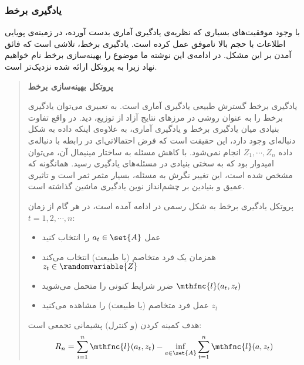 \subsubsection{
یادگیری برخط
}

با وجود موفقیت‌های بسیاری که نظریه‌ی یادگیری آماری بدست آورده، در زمینه‌ی پویایی اطلاعات با حجم بالا
ناموفق عمل کرده است. یادگیری برخط، تلاشی است که فائق آمدن بر این مشکل. در ادامه‌ی این نوشته ما موضوع را بهینه‌سازی برخط نام خواهیم نهاد زیرا به پروتکل ارائه شده نزدیک‌تر است.



\begin{quote}
{\bf
پروتکل بهینه‌سازی برخط
}

یادگیری برخط گسترش طبیعی یادگیری آماری است. به تعبیری می‌توان یادگیری برخط را به عنوان روشی در مرزهای نتایج آزاد از توزیع، دید. در واقع تفاوت بنیادی میان یادگیری برخط و یادگیری آماری، به علاوه‌ی اینکه داده به شکل دنباله‌ای وجود دارد، این حقیقت است که فرض احتمالاتی‌ای در رابطه با دنباله‌ی داده 
$Z_1, \cdots, Z_n$ 
انجام نمی‌شود. با کاهش مسئله به ساختار مینیمال
آن، می‌توان امیدوار بود که به سختی بنیادی در مسئله‌های یادگیری رسید. همانگونه که مشخص شده است، این تغییر نگرش به مسئله، بسیار مثمر ثمر است و تاثیری عمیق و بنیادین بر چشم‌انداز نوین یادگیری ماشین گذاشته است.


پروتکل یادگیری برخط به شکل رسمی در ادامه آمده است، در هر گام از زمان 
$t = 1, 2, \cdots, n$: 

\begin{itemize}
\item
عمل 
$a_t \in \set{A}$ 
را انتخاب کنید

\item
همزمان یک فرد متخاصم
(یا طبیعت) انتخاب می‌کند
$z_t \in \randomvariable{Z}$

\item
ضرر شرایط کنونی را متحمل می‌شوید 
$\mthfnc{l}(a_t, z_t)$

\item
عمل فرد متخاصم (یا طبیعت) را مشاهده می‌کنید 
$z_t$

\end{itemize}

هدف کمینه کردن (و کنترل) پشیمانی
تجمعی است:
\[
R_n = \sum^{n}_{i = 1} \mthfnc{l}(a_t,z_t) - \inf_{a \in \set{A}} \sum^{n}_{t=1} \mthfnc{l}(a,z_t)
\]

\end{quote}

